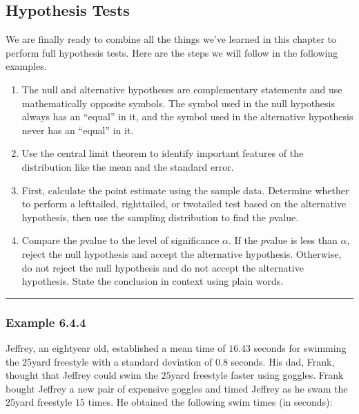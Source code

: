 \documentclass[letterpaper,10pt,english]{jupyterBook}
\begin{document}
\subsection{Hypothesis Tests}
\label{\detokenize{Ch6 An Introduction to Hypothesis Testing/6.4 Hypothesis Tests of One Population:hypothesis-tests}}
\sphinxAtStartPar
We are finally ready to combine all the things we’ve learned in this chapter to perform full hypothesis tests. Here are the steps we will follow in the following examples.
\begin{enumerate}
%
\item {} 
\sphinxAtStartPar
{}The null and alternative hypotheses are complementary statements and use mathematically opposite symbols. The symbol used in the null hypothesis always has an “equal” in it, and the symbol used in the alternative hypothesis never has an “equal” in it.

\item {} 
\sphinxAtStartPar
{}Use the central limit theorem to identify important features of the distribution like the mean and the standard error.

\item {} 
\sphinxAtStartPar
{}First, calculate the point estimate using the sample data. Determine whether to perform a left\sphinxhyphen{}tailed, right\sphinxhyphen{}tailed, or two\sphinxhyphen{}tailed test based on the alternative hypothesis, then use the sampling distribution to find the \(p\)\sphinxhyphen{}value.

\item {} 
\sphinxAtStartPar
{}Compare the \(p\)\sphinxhyphen{}value to the level of significance \(\alpha\). If the \(p\)\sphinxhyphen{}value is less than \(\alpha\), reject the null hypothesis and accept the alternative hypothesis. Otherwise, do not reject the null hypothesis and do not accept the alternative hypothesis. State the conclusion in context using plain words.

\end{enumerate}


\bigskip\hrule\bigskip



\subsubsection{Example 6.4.4}
\label{\detokenize{Ch6 An Introduction to Hypothesis Testing/6.4 Hypothesis Tests of One Population:example-6-4-4}}
\sphinxAtStartPar
Jeffrey, an eight\sphinxhyphen{}year old, established a mean time of \(16.43\) seconds for swimming the \(25\)\sphinxhyphen{}yard freestyle with a standard deviation of \(0.8\) seconds. His dad, Frank, thought that Jeffrey could swim the \(25\)\sphinxhyphen{}yard freestyle faster using goggles. Frank bought Jeffrey a new pair of expensive goggles and timed Jeffrey as he swam the \(25\)\sphinxhyphen{}yard freestyle \(15\) times. He obtained the following swim times (in seconds):
\end{document}

